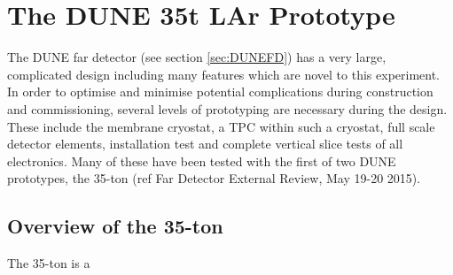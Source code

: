 \section{The DUNE 35t LAr Prototype}

The DUNE far detector (see section \ref{sec:DUNEFD}) has a very large, complicated design including many features which are novel to this experiment. In order to optimise and minimise potential complications during construction and commissioning, several levels of prototyping are necessary during the design. These include the membrane cryostat, a TPC within such a cryostat, full scale detector elements, installation test and complete vertical slice tests of all electronics. Many of these have been tested with the first of two DUNE prototypes, the 35-ton (ref Far Detector External Review, May 19-20 2015).

\subsection{Overview of the 35-ton}

The 35-ton is a 
